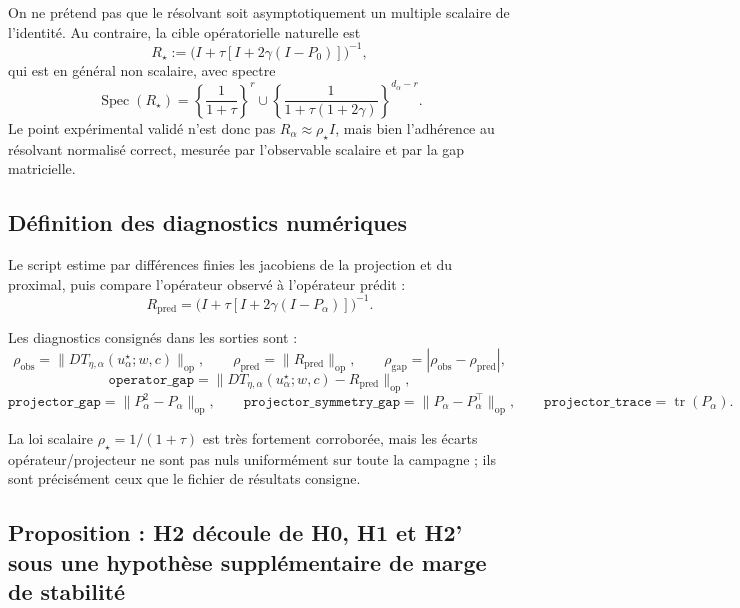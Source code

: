\begin{remark}
On ne prétend pas que le résolvant soit asymptotiquement un multiple scalaire de l'identité.
Au contraire, la cible opératorielle naturelle est
\[
R_\star:=\bigl(I+\tau[I+2\gamma(I-P_0)]\bigr)^{-1},
\]
qui est en général non scalaire, avec spectre
\[
\operatorname{Spec}(R_\star)
=
\left\{
\frac{1}{1+\tau}
\right\}^{r}
\cup
\left\{
\frac{1}{1+\tau(1+2\gamma)}
\right\}^{d_\alpha-r}.
\]
Le point expérimental validé n'est donc pas \(R_\alpha\approx \rho_\star I\), mais bien l'adhérence au résolvant normalisé correct, mesurée par l'observable scalaire et par la gap matricielle.
\end{remark}

\subsection{Définition des diagnostics numériques}

Le script estime par différences finies les jacobiens de la projection et du proximal, puis compare l'opérateur observé à l'opérateur prédit :
\[
R_{\mathrm{pred}}=\bigl(I+\tau[I+2\gamma(I-P_\alpha)]\bigr)^{-1}.
\]

Les diagnostics consignés dans les sorties sont :
\[
\rho_{\mathrm{obs}}=\|DT_{\eta,\alpha}(u_\alpha^\star;w,c)\|_{\mathrm{op}},
\qquad
\rho_{\mathrm{pred}}=\|R_{\mathrm{pred}}\|_{\mathrm{op}},
\qquad
\rho_{\mathrm{gap}}=|\rho_{\mathrm{obs}}-\rho_{\mathrm{pred}}|,
\]
\[
\texttt{operator\_gap}
=
\|DT_{\eta,\alpha}(u_\alpha^\star;w,c)-R_{\mathrm{pred}}\|_{\mathrm{op}},
\]
\[
\texttt{projector\_gap}
=
\|P_\alpha^2-P_\alpha\|_{\mathrm{op}},
\qquad
\texttt{projector\_symmetry\_gap}
=
\|P_\alpha-P_\alpha^\top\|_{\mathrm{op}},
\qquad
\texttt{projector\_trace}
=
\operatorname{tr}(P_\alpha).
\]

La loi scalaire \(\rho_\star=1/(1+\tau)\) est très fortement corroborée, mais les écarts opérateur/projecteur ne sont pas nuls uniformément sur toute la campagne ; ils sont précisément ceux que le fichier de résultats consigne.

\subsection{Proposition : H2 découle de H0, H1 et H2' sous une hypothèse supplémentaire de marge de stabilité}

